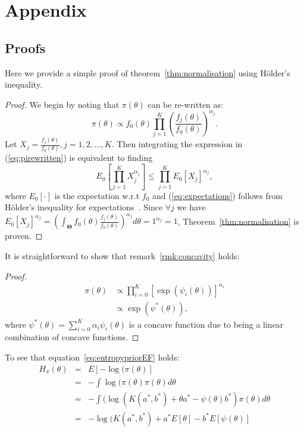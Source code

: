 \documentclass[a4paper, notitlepage, 10pt]{article}
\begin{document}
\section*{Appendix}

\subsection*{Proofs}

Here we provide a simple proof of theorem~\ref{thm:normalisation} using H\"{o}lder's inequality.
\begin{proof}
We begin by noting that $\pi(\theta)$ can be re-written as:
\begin{equation}
\label{eq:pirewritten}
 \pi(\theta) \propto f_0(\theta)\prod_{j=1}^{K} \left(\frac{f_j(\theta)}{f_0(\theta)}\right)^{\alpha_j}.
\end{equation}
Let $X_j = \frac{f_j(\theta)}{f_0(\theta)}, j=1, 2,\ldots, K$. 
Then integrating the expression in (\ref{eq:pirewritten}) is equivalent to finding 
\begin{equation}
\label{eq:expectations}
E_{0}\left[\prod_{j=1}^KX_j^{\alpha_j}\right] \leq \prod_{j=1}^KE_{0}[X_j]^{\alpha_j},
\end{equation}
where $E_{0}[\cdot]$ is the expectation w.r.t $f_0$ and (\ref{eq:expectations}) follows from H\"{o}lder's inequality for expectations~\citep{yeh2011}.
Since $\forall j$ we have $E_{0}[X_j]^{\alpha_j} = \left(\int_{\boldsymbol\Theta}f_0(\theta)\frac{f_j(\theta)}{f_0(\theta)}\right)^{\alpha_j}d\theta=1^{\alpha_j}=1$, Theorem~\ref{thm:normalisation} is proven.
\end{proof}
It is straightforward to show that remark~\ref{rmk:concavity} holds:
\begin{proof}
\begin{align}
 \pi(\theta) &\propto \prod_{i=0}^{K} [\exp(\psi_i(\theta))]^{\alpha_i}\\
             &\propto \exp(\psi^{\ast}(\theta)),
\end{align}
 where $\psi^{\ast}(\theta) = \sum_{i=0}^{K}\alpha_i\psi_i(\theta)$ is a concave function due to being a linear combination of concave functions.
\end{proof}
To see that equation~\ref{eq:entropypriorEF} holds:
\begin{eqnarray*} 
H_\pi(\theta) & = & E[-\log(\pi(\theta)] \\
              & = & - \int \log(\pi(\theta) \pi(\theta) d\theta \\
              & = & - \int (\log(K(a^*, b^*) + \theta a^* - \psi(\theta) b^*) \pi(\theta) d\theta \\
              & = & - \log(K(a^*, b^*) + a^*  E[\theta]-  b^*  E[\psi(\theta)]
\end{eqnarray*}
\end{document}
